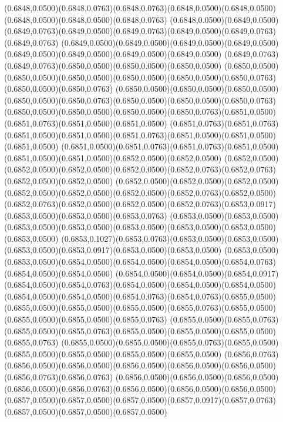(0.6848,0.0500)(0.6848,0.0763)(0.6848,0.0763)(0.6848,0.0500)(0.6848,0.0500)(0.6848,0.0500)(0.6848,0.0500)(0.6848,0.0763)
(0.6848,0.0500)(0.6849,0.0500)(0.6849,0.0763)(0.6849,0.0500)(0.6849,0.0763)(0.6849,0.0500)(0.6849,0.0763)(0.6849,0.0763)
(0.6849,0.0500)(0.6849,0.0500)(0.6849,0.0500)(0.6849,0.0500)(0.6849,0.0500)(0.6849,0.0500)(0.6849,0.0500)(0.6849,0.0500)
(0.6849,0.0763)(0.6849,0.0763)(0.6850,0.0500)(0.6850,0.0500)(0.6850,0.0500)
\PST@Solid(0.6850,0.0500)(0.6850,0.0500)(0.6850,0.0500)(0.6850,0.0500)(0.6850,0.0500)(0.6850,0.0763)(0.6850,0.0500)(0.6850,0.0763)
(0.6850,0.0500)(0.6850,0.0500)(0.6850,0.0500)(0.6850,0.0500)(0.6850,0.0763)(0.6850,0.0500)(0.6850,0.0500)(0.6850,0.0763)
(0.6850,0.0500)(0.6850,0.0500)(0.6850,0.0500)(0.6850,0.0763)(0.6851,0.0500)(0.6851,0.0763)(0.6851,0.0500)(0.6851,0.0500)
(0.6851,0.0763)(0.6851,0.0763)(0.6851,0.0500)(0.6851,0.0500)(0.6851,0.0763)(0.6851,0.0500)(0.6851,0.0500)(0.6851,0.0500)
(0.6851,0.0500)(0.6851,0.0763)(0.6851,0.0763)(0.6851,0.0500)(0.6851,0.0500)(0.6851,0.0500)(0.6852,0.0500)(0.6852,0.0500)
(0.6852,0.0500)(0.6852,0.0500)(0.6852,0.0500)(0.6852,0.0500)(0.6852,0.0763)(0.6852,0.0763)(0.6852,0.0500)(0.6852,0.0500)
(0.6852,0.0500)(0.6852,0.0500)(0.6852,0.0500)(0.6852,0.0500)(0.6852,0.0500)(0.6852,0.0500)(0.6852,0.0763)(0.6852,0.0500)
(0.6852,0.0763)(0.6852,0.0500)(0.6852,0.0500)(0.6852,0.0763)(0.6853,0.0917)(0.6853,0.0500)(0.6853,0.0500)(0.6853,0.0763)
(0.6853,0.0500)(0.6853,0.0500)(0.6853,0.0500)(0.6853,0.0500)(0.6853,0.0500)(0.6853,0.0500)(0.6853,0.0500)(0.6853,0.0500)
(0.6853,0.1027)(0.6853,0.0763)(0.6853,0.0500)(0.6853,0.0500)(0.6853,0.0500)(0.6853,0.0917)(0.6853,0.0500)(0.6853,0.0500)
(0.6853,0.0500)(0.6853,0.0500)(0.6854,0.0500)(0.6854,0.0500)(0.6854,0.0500)(0.6854,0.0763)(0.6854,0.0500)(0.6854,0.0500)
(0.6854,0.0500)(0.6854,0.0500)(0.6854,0.0917)(0.6854,0.0500)(0.6854,0.0763)(0.6854,0.0500)(0.6854,0.0500)(0.6854,0.0500)
(0.6854,0.0500)(0.6854,0.0500)(0.6854,0.0763)(0.6854,0.0763)(0.6855,0.0500)
\PST@Solid(0.6855,0.0500)(0.6855,0.0500)(0.6855,0.0500)(0.6855,0.0763)(0.6855,0.0500)(0.6855,0.0500)(0.6855,0.0500)(0.6855,0.0763)
(0.6855,0.0500)(0.6855,0.0763)(0.6855,0.0500)(0.6855,0.0763)(0.6855,0.0500)(0.6855,0.0500)(0.6855,0.0500)(0.6855,0.0763)
(0.6855,0.0500)(0.6855,0.0500)(0.6855,0.0763)(0.6855,0.0500)(0.6855,0.0500)(0.6855,0.0500)(0.6855,0.0500)(0.6855,0.0500)
(0.6856,0.0763)(0.6856,0.0500)(0.6856,0.0500)(0.6856,0.0500)(0.6856,0.0500)(0.6856,0.0500)(0.6856,0.0763)(0.6856,0.0763)
(0.6856,0.0500)(0.6856,0.0500)(0.6856,0.0500)(0.6856,0.0500)(0.6856,0.0763)(0.6856,0.0500)(0.6856,0.0500)(0.6856,0.0500)
(0.6857,0.0500)(0.6857,0.0500)(0.6857,0.0500)(0.6857,0.0917)(0.6857,0.0763)(0.6857,0.0500)(0.6857,0.0500)(0.6857,0.0500)
